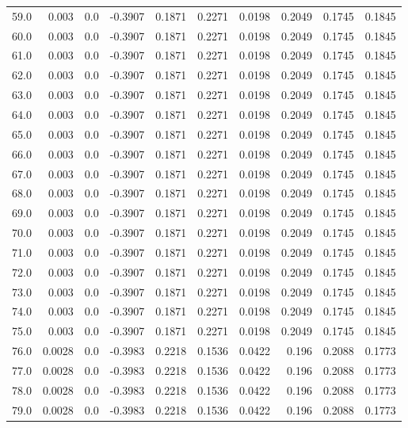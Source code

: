 \begin{longtable}{lrrrrrrrrr}
59.0 & 0.003 & 0.0 & -0.3907 & 0.1871 & 0.2271 & 0.0198 & 0.2049 & 0.1745 & 0.1845 \\
60.0 & 0.003 & 0.0 & -0.3907 & 0.1871 & 0.2271 & 0.0198 & 0.2049 & 0.1745 & 0.1845 \\
61.0 & 0.003 & 0.0 & -0.3907 & 0.1871 & 0.2271 & 0.0198 & 0.2049 & 0.1745 & 0.1845 \\
62.0 & 0.003 & 0.0 & -0.3907 & 0.1871 & 0.2271 & 0.0198 & 0.2049 & 0.1745 & 0.1845 \\
63.0 & 0.003 & 0.0 & -0.3907 & 0.1871 & 0.2271 & 0.0198 & 0.2049 & 0.1745 & 0.1845 \\
64.0 & 0.003 & 0.0 & -0.3907 & 0.1871 & 0.2271 & 0.0198 & 0.2049 & 0.1745 & 0.1845 \\
65.0 & 0.003 & 0.0 & -0.3907 & 0.1871 & 0.2271 & 0.0198 & 0.2049 & 0.1745 & 0.1845 \\
66.0 & 0.003 & 0.0 & -0.3907 & 0.1871 & 0.2271 & 0.0198 & 0.2049 & 0.1745 & 0.1845 \\
67.0 & 0.003 & 0.0 & -0.3907 & 0.1871 & 0.2271 & 0.0198 & 0.2049 & 0.1745 & 0.1845 \\
68.0 & 0.003 & 0.0 & -0.3907 & 0.1871 & 0.2271 & 0.0198 & 0.2049 & 0.1745 & 0.1845 \\
69.0 & 0.003 & 0.0 & -0.3907 & 0.1871 & 0.2271 & 0.0198 & 0.2049 & 0.1745 & 0.1845 \\
70.0 & 0.003 & 0.0 & -0.3907 & 0.1871 & 0.2271 & 0.0198 & 0.2049 & 0.1745 & 0.1845 \\
71.0 & 0.003 & 0.0 & -0.3907 & 0.1871 & 0.2271 & 0.0198 & 0.2049 & 0.1745 & 0.1845 \\
72.0 & 0.003 & 0.0 & -0.3907 & 0.1871 & 0.2271 & 0.0198 & 0.2049 & 0.1745 & 0.1845 \\
73.0 & 0.003 & 0.0 & -0.3907 & 0.1871 & 0.2271 & 0.0198 & 0.2049 & 0.1745 & 0.1845 \\
74.0 & 0.003 & 0.0 & -0.3907 & 0.1871 & 0.2271 & 0.0198 & 0.2049 & 0.1745 & 0.1845 \\
75.0 & 0.003 & 0.0 & -0.3907 & 0.1871 & 0.2271 & 0.0198 & 0.2049 & 0.1745 & 0.1845 \\
76.0 & 0.0028 & 0.0 & -0.3983 & 0.2218 & 0.1536 & 0.0422 & 0.196 & 0.2088 & 0.1773 \\
77.0 & 0.0028 & 0.0 & -0.3983 & 0.2218 & 0.1536 & 0.0422 & 0.196 & 0.2088 & 0.1773 \\
78.0 & 0.0028 & 0.0 & -0.3983 & 0.2218 & 0.1536 & 0.0422 & 0.196 & 0.2088 & 0.1773 \\
79.0 & 0.0028 & 0.0 & -0.3983 & 0.2218 & 0.1536 & 0.0422 & 0.196 & 0.2088 & 0.1773 \\

\end{longtable}
